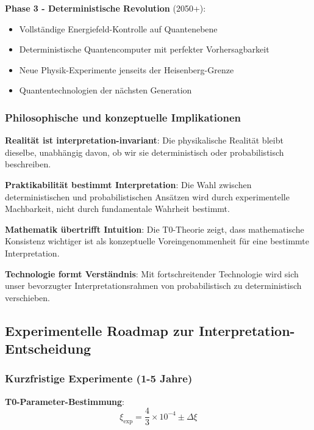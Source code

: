 \documentclass[12pt,a4paper]{article}
\newcommand{\xipar}{\xi}
\theoremstyle{definition}
\theoremstyle{remark}
\begin{document}
\textbf{Phase 3 - Deterministische Revolution} (2050+):
\begin{itemize}
	\item Vollständige Energiefeld-Kontrolle auf Quantenebene
	\item Deterministische Quantencomputer mit perfekter Vorhersagbarkeit
	\item Neue Physik-Experimente jenseits der Heisenberg-Grenze
	\item Quantentechnologien der nächsten Generation
\end{itemize}

\subsubsection{Philosophische und konzeptuelle Implikationen}

\begin{tcolorbox}[colback=green!5!white,colframe=green!75!black,title=Fundamentale Erkenntnisse]
	\textbf{Realität ist interpretation-invariant}: Die physikalische Realität bleibt dieselbe, unabhängig davon, ob wir sie deterministisch oder probabilistisch beschreiben.
	
	\textbf{Praktikabilität bestimmt Interpretation}: Die Wahl zwischen deterministischen und probabilistischen Ansätzen wird durch experimentelle Machbarkeit, nicht durch fundamentale Wahrheit bestimmt.
	
	\textbf{Mathematik übertrifft Intuition}: Die T0-Theorie zeigt, dass mathematische Konsistenz wichtiger ist als konzeptuelle Voreingenommenheit für eine bestimmte Interpretation.
	
	\textbf{Technologie formt Verständnis}: Mit fortschreitender Technologie wird sich unser bevorzugter Interpretationsrahmen von probabilistisch zu deterministisch verschieben.
\end{tcolorbox}

\subsection{Experimentelle Roadmap zur Interpretation-Entscheidung}

\subsubsection{Kurzfristige Experimente (1-5 Jahre)}

\textbf{T0-Parameter-Bestimmung}:
\begin{equation}
	\xipar_{\text{exp}} = \frac{4}{3} \times 10^{-4} \pm \Delta\xipar
\end{equation}
\end{document}
